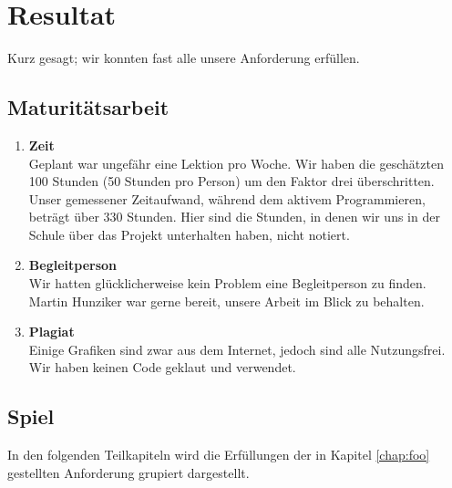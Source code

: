 \chapter{Resultat}
Kurz gesagt; wir konnten fast alle unsere Anforderung erfüllen.

\section{Maturitätsarbeit}
\begin{enumerate}
    \item \textbf{Zeit} \\
        Geplant war ungefähr eine Lektion pro Woche. Wir haben die geschätzten 100 Stunden (50 Stunden pro Person) um den Faktor drei überschritten. Unser gemessener Zeitaufwand, während dem aktivem Programmieren,
        beträgt über 330 Stunden. Hier sind die Stunden, in denen wir uns in der Schule über das Projekt unterhalten haben, nicht notiert.
    \item \textbf{Begleitperson} \\
        Wir hatten glücklicherweise kein Problem eine Begleitperson zu finden. Martin Hunziker war gerne bereit, unsere Arbeit im Blick zu behalten.
    \item \textbf{Plagiat} \\
        Einige Grafiken sind zwar aus dem Internet, jedoch sind alle Nutzungsfrei. Wir haben keinen Code geklaut und verwendet. 
\end{enumerate}

\section{Spiel}
In den folgenden Teilkapiteln wird die Erfüllungen der in Kapitel \autoref{chap:foo} gestellten Anforderung grupiert dargestellt. 
